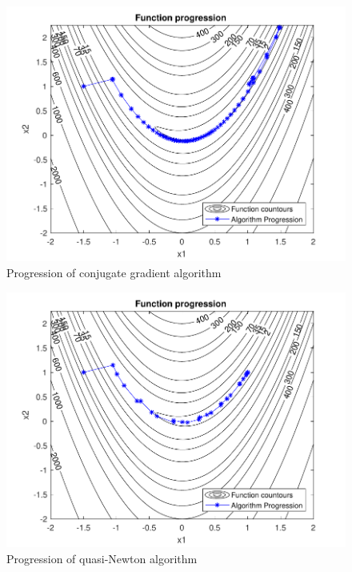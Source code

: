 \documentclass{article}
\newcommand{\wide}{0.7\linewidth}
\begin{document}
\begin{figure}[H]
	\centering
	\includegraphics[width=\wide]{progression2.pdf}
	\caption{Progression of conjugate gradient algorithm}
	\label{fig:steepes2}
\end{figure}

\begin{figure}[H]
	\centering
	\includegraphics[width=\wide]{progression3.pdf}
	\caption{Progression of quasi-Newton algorithm}
	\label{fig:steepest3}
\end{figure}
\end{document}

